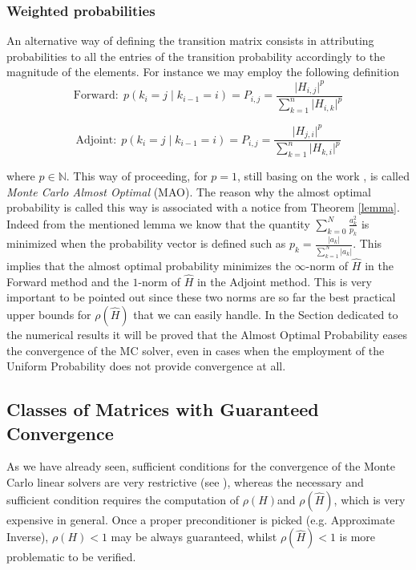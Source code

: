 \documentclass[a4paper,10pt]{article}
\begin{document}
\subsubsection{Weighted probabilities}
An alternative way of defining the transition matrix consists in attributing
probabilities to all the entries of the transition probability accordingly
to the magnitude of the elements. For instance we may employ the following
definition
\[
\text{Forward}: \;
p(k_i=j \;\lvert\;k_{i-1}=i )=P_{i,j}=\frac{\lvert
H_{i,j}\rvert^p}{\sum_{k=1}^n
\lvert H_{i,k}\rvert^p}
\]

\[
\text{Adjoint}: \;
p(k_i=j \;\lvert\;k_{i-1}=i )=P_{i,j}=\frac{\lvert
H_{j,i}\rvert^p}{\sum_{k=1}^n
\lvert H_{k,i}\rvert^p}
\]


where $p\in \mathbb{N}$.
This way of proceeding, for $p=1$, still basing on the work \cite{AADBTW2005},
is called
\textit{Monte Carlo Almost Optimal} (MAO).
The reason why the almost optimal probability is called this way is associated
with a notice from Theorem \ref{lemma}. Indeed from
the mentioned lemma we know that the quantity $\displaystyle
\sum_{k=0}^N\frac{a_k^2}{p_k}$ is minimized when the probability vector is
defined such as $\displaystyle p_k=\frac{\lvert a_k\rvert}{\sum_{k=1}^N \lvert
a_k\rvert}$. This implies that the almost optimal probability minimizes the
$\infty$-norm of $\hat{H}$ in the Forward method and the $1$-norm of $\hat{H}$
in the
Adjoint method. This is very important to be pointed out since these two norms
are so far the best practical upper bounds for $\rho(\hat{H})$ that we can
easily
handle. In the Section dedicated to the numerical results it will be proved
that the Almost Optimal Probability eases the convergence of the MC solver,
even in cases when the employment of the Uniform Probability does not provide
convergence at all.

\subsection{Classes of Matrices with Guaranteed Convergence}

As we have already seen, sufficient conditions for
the convergence of the Monte Carlo linear solvers are very restrictive (see
\cite{MASC2013}), whereas the necessary and sufficient condition requires the
computation of
$\rho(H)$and $\rho(\hat{H})$, which is very expensive in general. Once a
proper
preconditioner is picked (e.g. Approximate Inverse), $\rho(H)<1$ may
be always guaranteed, whilst $\rho(\hat{H})<1$ is more
problematic to be verified.
\end{document}
